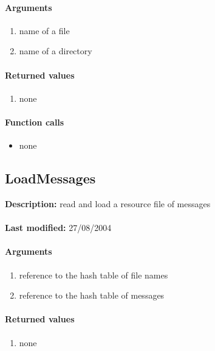 \paragraph{Arguments}
\begin{enumerate}
\item name of a file
\item name of a directory
\end{enumerate}

\paragraph{Returned values}
\begin{enumerate}
\item none
\end{enumerate}

\paragraph{Function calls}
\begin{itemize}
\item none
\end{itemize}

\subsection{LoadMessages}
\textbf{Description:} read and load a resource file of messages\\
\\\textbf{Last modified:} 27/08/2004

\paragraph{Arguments}
\begin{enumerate}
\item reference to the hash table of file names
\item reference to the hash table of messages
\end{enumerate}

\paragraph{Returned values}
\begin{enumerate}
\item none
\end{enumerate}

